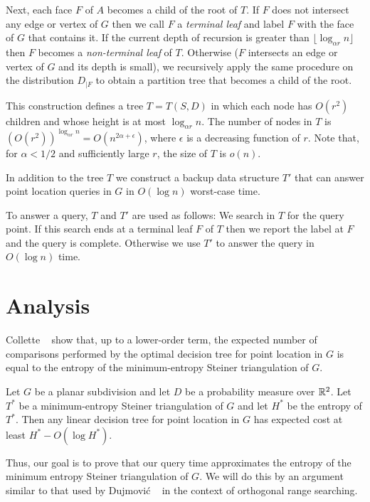 \documentclass{patmorin}
\begin{document}
Next, each face $F$ of $A$ becomes a child of the root of $T$.  If $F$
does not intersect any edge or vertex of $G$ then we call $F$ a
\emph{terminal leaf} and label $F$ with the face of $G$ that contains it.
If the current depth of recursion is greater than $\lfloor\log_{\alpha r}
n\rfloor$ then $F$ becomes a \emph{non-terminal leaf} of $T$.  Otherwise
($F$ intersects an edge or vertex of $G$ and its depth is small),
we recursively apply the same procedure on the distribution $D_{|F}$
to obtain a partition tree that becomes a child of the root.

This construction defines a tree $T=T(S,D)$ in which each node has
$O(r^2)$ children and whose height is at most $\log_{\alpha r} n$.
The number of nodes in $T$ is $(O(r^2))^{\log_{\alpha r} n} =
O(n^{2\alpha+\epsilon})$, where $\epsilon$ is a decreasing function
of $r$.  Note that, for $\alpha < 1/2$ and sufficiently large $r$,
the size of $T$ is $o(n)$.

In addition to the tree $T$ we construct a backup data structure $T'$ that
can answer point location queries in $G$ in $O(\log n)$ worst-case time.

To answer a query, $T$ and $T'$ are used as follows:  We search in $T$
for the query point. If this search ends at a terminal leaf $F$ of $T$
then we report the label at $F$ and the query is complete.  Otherwise we
use $T'$ to answer the query in $O(\log n)$ time.

\section{Analysis}

Collette \etal\ \cite{cdilm08,cdilm09} show that, up to a lower-order
term, the expected number of comparisons performed by the optimal
decision tree for point location in $G$ is equal to the entropy of the
minimum-entropy Steiner triangulation of $G$.

\begin{thm}
Let $G$ be a planar subdivision and let $D$ be a probability measure
over $\mathbb{R}^2$.  Let $T^*$ be a  minimum-entropy Steiner triangulation of
$G$ and let $H^*$ be the entropy of $T^*$.  Then any linear decision tree
for point location in $G$ has expected cost at least $H^*-O(\log H^*)$.
\end{thm}

Thus, our goal is to prove that our query time approximates the entropy
of the minimum entropy Steiner triangulation of $G$.  We will do this
by an argument similar to that used by Dujmovi\'c \etal\ \cite{dhm09}
in the context of orthogonal range searching.
\end{document}
